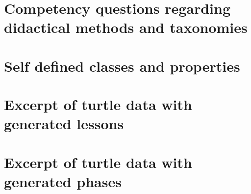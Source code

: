 \chapter{Competency questions regarding didactical methods and taxonomies}
\label{chap:appendix-cq}

\chapter{Self defined classes and properties}
\label{chap:appendix-myont}

\chapter{Excerpt of turtle data with generated lessons}
\label{chap:appendix-lesson}

\chapter{Excerpt of turtle data with generated phases}
\label{chap:appendix-phase}
